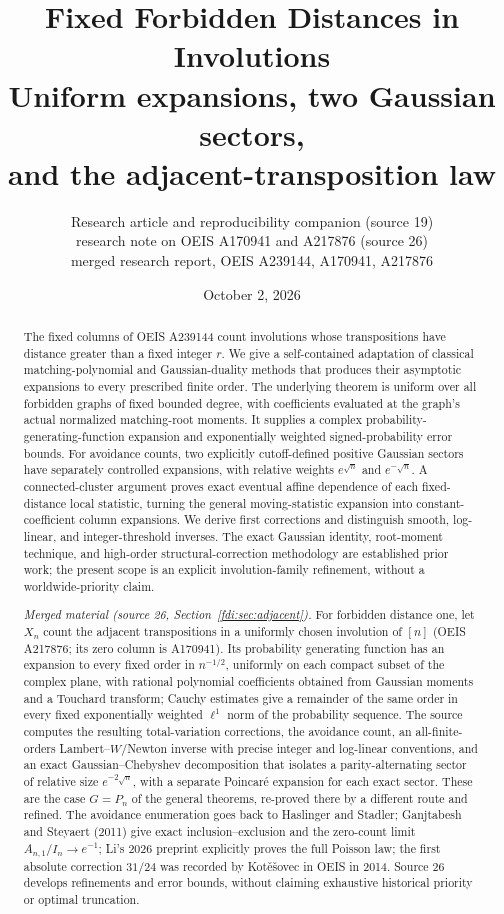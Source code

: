\documentclass[11pt,letterpaper]{article}
\title{Fixed Forbidden Distances in Involutions\\\large Uniform expansions, two Gaussian sectors,\\and the adjacent-transposition law}
\author{Research article and reproducibility companion (source 19)\\
research note on OEIS A170941 and A217876 (source 26)\\[2pt]
\small merged research report, OEIS A239144, A170941, A217876}
\date{October 2, 2026}
\theoremstyle{remark}\newtheorem{remark}[theorem]{Remark}
\begin{document}
\maketitle
\begin{abstract}
The fixed columns of OEIS A239144 count involutions whose transpositions have distance greater than a fixed integer $r$. We give a self-contained adaptation of classical matching-polynomial and Gaussian-duality methods that produces their asymptotic expansions to every prescribed finite order. The underlying theorem is uniform over all forbidden graphs of fixed bounded degree, with coefficients evaluated at the graph's actual normalized matching-root moments. It supplies a complex probability-generating-function expansion and exponentially weighted signed-probability error bounds. For avoidance counts, two explicitly cutoff-defined positive Gaussian sectors have separately controlled expansions, with relative weights $e^{\sqrt n}$ and $e^{-\sqrt n}$. A connected-cluster argument proves exact eventual affine dependence of each fixed-distance local statistic, turning the general moving-statistic expansion into constant-coefficient column expansions. We derive first corrections and distinguish smooth, log-linear, and integer-threshold inverses. The exact Gaussian identity, root-moment technique, and high-order structural-correction methodology are established prior work; the present scope is an explicit involution-family refinement, without a worldwide-priority claim.

\emph{Merged material (source 26, Section~\ref{fdi:sec:adjacent}).} For forbidden distance one, let $X_n$ count the adjacent transpositions in a uniformly chosen involution of $[n]$ (OEIS A217876; its zero column is A170941). Its probability generating function has an expansion to every fixed order in $n^{-1/2}$, uniformly on each compact subset of the complex plane, with rational polynomial coefficients obtained from Gaussian moments and a Touchard transform; Cauchy estimates give a remainder of the same order in every fixed exponentially weighted $\ell^1$ norm of the probability sequence. The source computes the resulting total-variation corrections, the avoidance count, an all-finite-orders Lambert--$W$/Newton inverse with precise integer and log-linear conventions, and an exact Gaussian--Chebyshev decomposition that isolates a parity-alternating sector of relative size $e^{-2\sqrt n}$, with a separate Poincar\'e expansion for each exact sector. These are the case $G=P_n$ of the general theorems, re-proved there by a different route and refined. The avoidance enumeration goes back to Haslinger and Stadler; Ganjtabesh and Steyaert (2011) give exact inclusion--exclusion and the zero-count limit $A_{n,1}/I_n\to e^{-1}$; Li's 2026 preprint explicitly proves the full Poisson law; the first absolute correction $31/24$ was recorded by Kot\v{e}\v{s}ovec in OEIS in 2014. Source 26 develops refinements and error bounds, without claiming exhaustive historical priority or optimal truncation.
\end{abstract}
\end{document}
